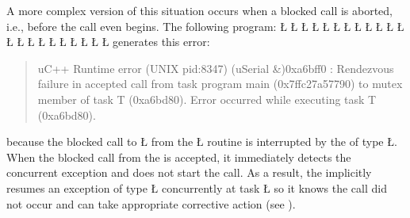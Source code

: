 \documentclass[openright,twoside]{report}
\begin{document}
A more complex version of this situation occurs when a blocked call is aborted, i.e., before the call even begins.
The following program:
\LGinlinefalse\LGbegin\lgrinde
\L{}
\L{\LB{}}
\L{}
\L{\LB{}}
\L{}
\L{\LB{}}
\L{\LB{}}
\L{}
\L{\LB{}}
\L{\LB{}}
\L{\LB{}}
\L{\LB{}}
\L{\LB{\};}}
\endlgrinde\LGend
\LGinlinefalse\LGbegin\lgrinde
\L{}
\L{\LB{}}
\L{\LB{}}
\L{\LB{}}
\L{\LB{}}
\L{\LB{}}
\L{\LB{}}
\L{\LB{}}
\L{\LB{\}}}
\endlgrinde\LGend
generates this error:
\begin{quote}
\BGfont
uC++ Runtime error (UNIX pid:8347) (uSerial \&)0xa6bff0 : Rendezvous failure in accepted call from task program main (0x7ffc27a57790) to mutex member of task T (0xa6bd80).
Error occurred while executing task T (0xa6bd80).
\end{quote}
because the blocked call to \LGinlinetrue\LGbegin\lgrinde\L{}\endlgrinde\LGend{} from the \LGinlinetrue\LGbegin\lgrinde\L{}\endlgrinde\LGend{} routine is interrupted by the  of type \LGinlinetrue\LGbegin\lgrinde\L{}\endlgrinde\LGend{}.
When the blocked call from the  is accepted, it immediately detects the concurrent exception and does not start the call.
As a result, the  implicitly resumes an exception of type \LGinlinetrue\LGbegin\lgrinde\L{}\endlgrinde\LGend{} concurrently at task \LGinlinetrue\LGbegin\lgrinde\L{}\endlgrinde\LGend{} so it knows the call did not occur and can take appropriate corrective action (see ).
\end{document}

